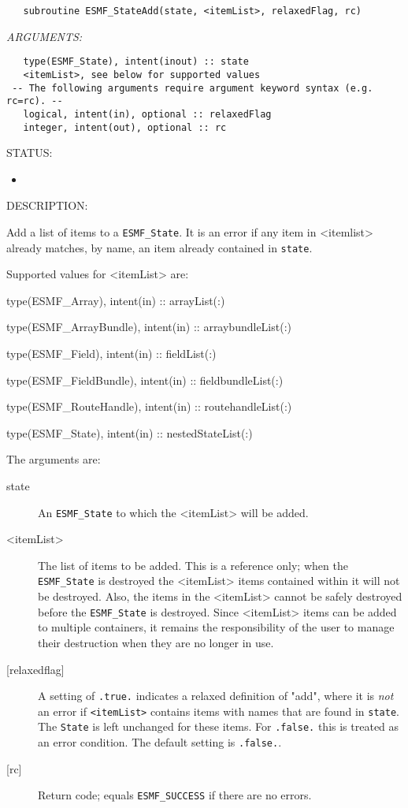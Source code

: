   
\begin{verbatim}   subroutine ESMF_StateAdd(state, <itemList>, relaxedFlag, rc)\end{verbatim}{\em ARGUMENTS:}
\begin{verbatim}   type(ESMF_State), intent(inout) :: state
   <itemList>, see below for supported values
 -- The following arguments require argument keyword syntax (e.g. rc=rc). --
   logical, intent(in), optional :: relaxedFlag
   integer, intent(out), optional :: rc\end{verbatim}
{\sf STATUS:}
   \begin{itemize}
   \item{}
   \end{itemize}
  
{\sf DESCRIPTION:\\ }


   Add a list of items to a {\tt ESMF\_State}. It is an error if any item in
   <itemlist> already matches, by name, an item already contained in {\tt state}.
  
   Supported values for <itemList> are:
   \begin{description}
   \item type(ESMF\_Array), intent(in) :: arrayList(:)
   \item type(ESMF\_ArrayBundle), intent(in) :: arraybundleList(:)
   \item type(ESMF\_Field), intent(in) :: fieldList(:)
   \item type(ESMF\_FieldBundle), intent(in) :: fieldbundleList(:)
   \item type(ESMF\_RouteHandle), intent(in) :: routehandleList(:)
   \item type(ESMF\_State), intent(in) :: nestedStateList(:)
   \end{description}
  
   The arguments are:
   \begin{description}
   \item[state]
   An {\tt ESMF\_State} to which the <itemList> will be added.
   \item[<itemList>]
   The list of items to be added.
   This is a reference only; when
   the {\tt ESMF\_State} is destroyed the <itemList> items contained within it will
   not be destroyed. Also, the items in the <itemList> cannot be safely
   destroyed before the {\tt ESMF\_State} is destroyed.
   Since <itemList> items can be added to multiple containers, it remains
   the responsibility of the user to manage their
   destruction when they are no longer in use.
   \item[{[relaxedflag]}]
   A setting of {\tt .true.} indicates a relaxed definition of "add",
   where it is {\em not} an error if {\tt <itemList>} contains items
   with names that are found in {\tt state}. The {\tt State}
   is left unchanged for these items. For {\tt .false.} this is treated
   as an error condition. The default setting is {\tt .false.}.
   \item[{[rc]}]
   Return code; equals {\tt ESMF\_SUCCESS} if there are no errors.
   \end{description} 
 
